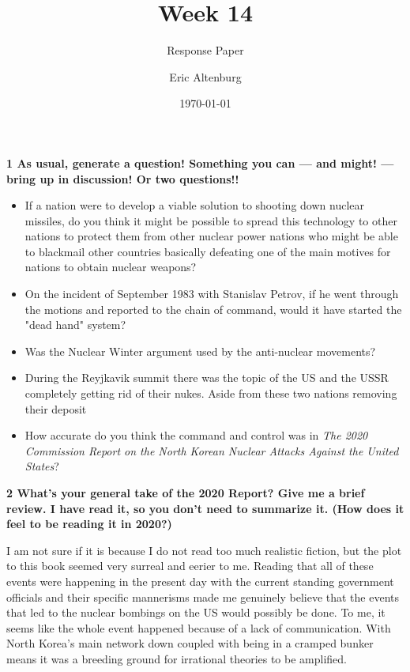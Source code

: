 \documentclass[12pt]{turabian-researchpaper}
\title{Week 14}
\subtitle{Response Paper}
\author{Eric Altenburg}
\date{\today}
\newcommand\question[2]{\noindent\textbf{#1 \quad #2}}
\begin{document}
\maketitle

\question{1}{As usual, generate a question! Something you can — and might! — bring up in discussion! Or two questions!!}

	\begin{itemize}
		\item If a nation were to develop a viable solution to shooting down nuclear missiles, do you think it might be possible to spread this technology to other nations to protect them from other nuclear power nations who might be able to blackmail other countries basically defeating one of the main motives for nations to obtain nuclear weapons?
		\item On the incident of September 1983 with Stanislav Petrov, if he went through the motions and reported to the chain of command, would it have started the "dead hand" system?
		\item Was the Nuclear Winter argument used by the anti-nuclear movements?
		\item During the Reyjkavik summit there was the topic of the US and the USSR completely getting rid of their nukes. Aside from these two nations removing their deposit
		\item How accurate do you think the command and control was in \textit{The 2020 Commission Report on the North Korean Nuclear Attacks Against the United States}?
	\end{itemize}


\question{2}{What's your general take of the 2020 Report? Give me a brief review. I have read it, so you don't need to summarize it. (How does it feel to be reading it in 2020?)}

	I am not sure if it is because I do not read too much realistic fiction, but the plot to this book seemed very surreal and eerier to me. Reading that all of these events were happening in the present day with the current standing government officials and their specific mannerisms made me genuinely believe that the events that led to the nuclear bombings on the US would possibly be done. To me, it seems like the whole event happened because of a lack of communication. With North Korea's main network down coupled with being in a cramped bunker means it was a breeding ground for irrational theories to be amplified.
\end{document}
